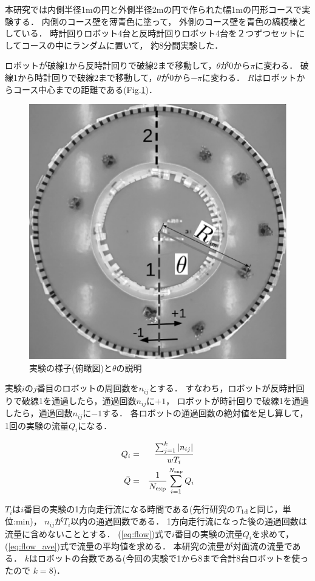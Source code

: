 本研究では内側半径1mの円と外側半径2mの円で作られた幅1mの円形コースで実験する．
内側のコース壁を薄青色に塗って，
外側のコース壁を青色の縞模様としている．
時計回りロボット4台と反時計回りロボット4台を２つずつセットにしてコースの中にランダムに置いて，
約8分間実験した．


ロボットが破線1から反時計回りで破線2まで移動して，$\theta$が0から$\pi$に変わる．
破線1から時計回りで破線2まで移動して，$\theta$が0から$-\pi$に変わる．
$R$はロボットからコース中心までの距離である(Fig.\ref{courseshitar})．

\begin{figure}[h]
        \centering
        \includegraphics[width=0.6\linewidth]{shitaR.eps}
        \caption{実験の様子(俯瞰図)と$\theta$の説明}
        \label{courseshitar}
\end{figure}

実験$i$の$j$番目のロボットの周回数を$n_{ij}$とする．
すなわち，ロボットが反時計回りで破線1を通過したら，通過回数$n_{ij}$に$+1$，
ロボットが時計回りで破線1を通過したら，通過回数$n_{ij}$に$-1$する．
各ロボットの通過回数の絶対値を足し算して，1回の実験の流量$Q_i$になる．

\begin{eqnarray}
Q_i &=& \frac{\sum_{j=1}^{k} |n_{ij}|}{wT_i}
\label{eq:flow} \\
\bar{Q} &=& \frac{1}{N_{\rm exp}}\sum_{i=1}^{N_{\rm exp}} Q_i
\label{eq:flow_ave} 
\end{eqnarray}


$T_i$は$i$番目の実験の1方向走行流になる時間である(先行研究\cite{li2020}の$T_{\rm 1d}$と同じ，単位:min)，
$n_{ij}$が$T_i$以内の通過回数である．
1方向走行流になった後の通過回数は流量に含めないこととする．
(\ref{eq:flow})式で$i$番目の実験の流量$Q_i$を求めて，
(\ref{eq:flow_ave})式で流量の平均値を求める．
本研究の流量が対面流の流量である．
$k$はロボットの台数である(今回の実験で1から8まで合計8台ロボットを使ったので $k=8$)．

